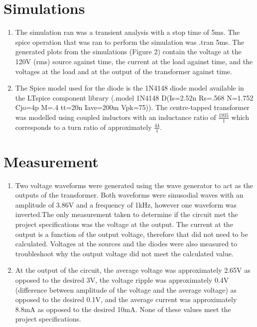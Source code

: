 \documentclass[12pt]{article}
\begin{document}
\section{Simulations}
\begin{enumerate}[label=\alph*.]
    \item %
    The simulation ran was a transient analysis with a stop time of 5ms. The spice operation that was ran to perform the simulation was .tran 5ms. The generated plots from the simulations (Figure 2) contain the voltage at the 120V (rms) source against time, the current at the load against time, and the voltages at the load and at the output of the transformer against time.  
    \item %
    The Spice model used for the diode is the 1N4148 diode model available in the LTspice component library (.model 1N4148 D(Is=2.52n Rs=.568 N=1.752 Cjo=4p M=.4 tt=20n Iave=200m Vpk=75)). The centre-tapped transformer was modelled using coupled inductors with an inductance ratio of $\frac{1935}{1}$ which corresponds to a turn ratio of approximately $\frac{44}{1}$.
\end{enumerate}
\section{Measurement}
\begin{enumerate}[label=\alph*.]
    \item %
    Two voltage waveforms were generated using the wave generator to act as the outputs of the transformer. Both waveforms were sinusodial waves with an amplitude of 3.86V and a frequency of 1kHz, however one waveform was inverted.The only measurement taken to determine if the circuit met the project specifications was the voltage at the output. The current at the output is a function of the output voltage, therefore that did not need to be calculated. Voltages at the sources and the diodes were also measured to troubleshoot why the output voltage did not meet the calculated value.
    \item %
    At the output of the circuit, the average voltage was approximately 2.65V as opposed to the desired 3V, the voltage ripple was approximately 0.4V (difference between amplitude of the voltage and the average voltage) as opposed to the desired 0.1V, and the average current was approximately 8.8mA as opposed to the desired 10mA. None of these values meet the project specifications.
\end{enumerate}
\end{document}
